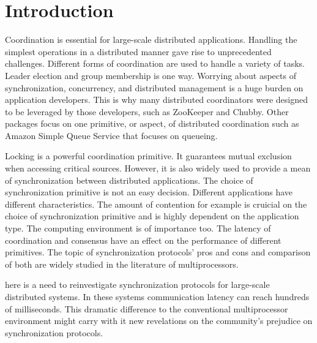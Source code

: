 \section{Introduction}\label{sec:intro}

Coordination is essential for large-scale distributed applications. Handling the simplest operations in a distributed manner gave rise to unprecedented challenges. Different forms of coordination are used to handle a variety of tasks. Leader election and group membership is one way. Worrying about aspects of synchronization, concurrency, and distributed management is a huge burden on application developers. This is why many distributed coordinators were designed to be leveraged by those developers, such as ZooKeeper and Chubby. Other packages focus on one primitive, or aspect, of distributed coordination such as Amazon Simple Queue Service that focuses on queueing.

Locking is a powerful coordination primitive. It guarantees mutual exclusion when accessing critical sources. However, it is also widely used to provide a mean of synchronization between distributed applications. The choice of synchronization primitive is not an easy decision. Different applications have different characteristics. The amount of contention for example is cruicial on the choice of synchronization primitive and is highly dependent on the application type. The computing environment is of importance too. The latency of coordination and consensus have an effect on the performance of different primitives. The topic of synchronization protocols' pros and cons and comparison of both are widely studied in the literature of multiprocessors.

here is a need to reinvestigate synchronization protocols for large-scale distributed systems. In these systems communication latency can reach hundreds of milliseconds. This dramatic difference to the conventional multiprocessor environment might carry with it new revelations on the community's prejudice on synchronization protocols. 
